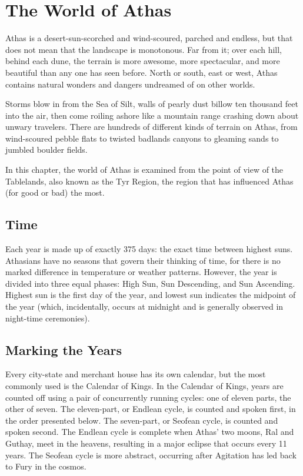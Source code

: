 \section{The World of Athas}
Athas is a desert-sun-scorched and wind-scoured, parched and endless, but that does not mean that the landscape is monotonous. Far from it; over each hill, behind each dune, the terrain is more awesome, more spectacular, and more beautiful than any one has seen before. North or south, east or west, Athas contains natural wonders and dangers undreamed of on other worlds.

Storms blow in from the Sea of Silt, walls of pearly dust billow ten thousand feet into the air, then come roiling ashore like a mountain range crashing down about unwary travelers. There are hundreds of different kinds of terrain on Athas, from wind-scoured pebble flats to twisted badlands canyons to gleaming sands to jumbled boulder fields.

In this chapter, the world of Athas is examined from the point of view of the Tablelands, also known as the Tyr Region, the region that has influenced Athas (for good or bad) the most.

\subsection{Time}
Each year is made up of exactly 375 days: the exact time between highest suns. Athasians have no seasons that govern their thinking of time, for there is no marked difference in temperature or weather patterns. However, the year is divided into three equal phases: High Sun, Sun Descending, and Sun Ascending. Highest sun is the first day of the year, and lowest sun indicates the midpoint of the year (which, incidentally, occurs at midnight and is generally observed in night-time ceremonies).

\subsection{Marking the Years}
Every city-state and merchant house has its own calendar, but the most commonly used is the Calendar of Kings. In the Calendar of Kings, years are counted off using a pair of concurrently running cycles: one of eleven parts, the other of seven. The eleven-part, or Endlean cycle, is counted and spoken first, in the order presented below. The seven-part, or Seofean cycle, is counted and spoken second. The Endlean cycle is complete when Athas' two moons, Ral and Guthay, meet in the heavens, resulting in a major eclipse that occurs every 11 years. The Seofean cycle is more abstract, occurring after Agitation has led back to Fury in the cosmos.

